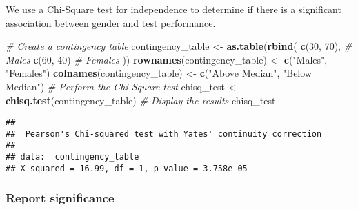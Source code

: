 \documentclass[
]{article}
\newenvironment{Shaded}{\begin{snugshade}}{\end{snugshade}}
\newcommand{\CommentTok}[1]{\textcolor[rgb]{0.56,0.35,0.01}{\textit{#1}}}
\newcommand{\DecValTok}[1]{\textcolor[rgb]{0.00,0.00,0.81}{#1}}
\newcommand{\FunctionTok}[1]{\textcolor[rgb]{0.13,0.29,0.53}{\textbf{#1}}}
\newcommand{\NormalTok}[1]{#1}
\newcommand{\OtherTok}[1]{\textcolor[rgb]{0.56,0.35,0.01}{#1}}
\newcommand{\StringTok}[1]{\textcolor[rgb]{0.31,0.60,0.02}{#1}}
\begin{document}
We use a Chi-Square test for independence to determine if there is a
significant association between gender and test performance.

\begin{Shaded}
\begin{Highlighting}[]
\CommentTok{\# Create a contingency table}
\NormalTok{contingency\_table }\OtherTok{\textless{}{-}} \FunctionTok{as.table}\NormalTok{(}\FunctionTok{rbind}\NormalTok{(}
  \FunctionTok{c}\NormalTok{(}\DecValTok{30}\NormalTok{, }\DecValTok{70}\NormalTok{),  }\CommentTok{\# Males}
  \FunctionTok{c}\NormalTok{(}\DecValTok{60}\NormalTok{, }\DecValTok{40}\NormalTok{)   }\CommentTok{\# Females}
\NormalTok{))}
\FunctionTok{rownames}\NormalTok{(contingency\_table) }\OtherTok{\textless{}{-}} \FunctionTok{c}\NormalTok{(}\StringTok{"Males"}\NormalTok{, }\StringTok{"Females"}\NormalTok{)}
\FunctionTok{colnames}\NormalTok{(contingency\_table) }\OtherTok{\textless{}{-}} \FunctionTok{c}\NormalTok{(}\StringTok{"Above Median"}\NormalTok{, }\StringTok{"Below Median"}\NormalTok{)}
\CommentTok{\# Perform the Chi{-}Square test}
\NormalTok{chisq\_test }\OtherTok{\textless{}{-}} \FunctionTok{chisq.test}\NormalTok{(contingency\_table)}
\CommentTok{\# Display the results}
\NormalTok{chisq\_test}
\end{Highlighting}
\end{Shaded}

\begin{verbatim}
## 
##  Pearson's Chi-squared test with Yates' continuity correction
## 
## data:  contingency_table
## X-squared = 16.99, df = 1, p-value = 3.758e-05
\end{verbatim}

\subsubsection{Report significance}\label{report-significance}
\end{document}
